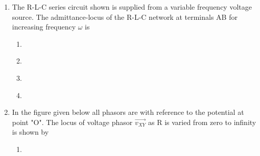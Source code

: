 \documentclass[journal]{IEEEtran}
\numberwithin{equation}{enumi}
\numberwithin{figure}{enumi}
\begin{document}
\begin{enumerate}
    \item 
    The R-L-C series circuit shown is supplied from a variable frequency voltage source. The admittance-locus of the R-L-C network at terminals AB for increasing frequency $\omega$ is

    \begin{figure}[H]
        \centering
        \resizebox{0.3\textwidth}{!}{}
    \end{figure}
    \hfill{}
        \begin{multicols}{2}
        \begin{enumerate}  
        
        \item 
        \begin{figure}[H]
        \centering
        \resizebox{0.3\textwidth}{!}{}
        \end{figure}
        \item 
        \begin{figure}[H]
        \centering
        \resizebox{0.3\textwidth}{!}{}
        \end{figure}
        
        \item 
        \begin{figure}[H]
        \centering
        \resizebox{0.26\textwidth}{!}{}
        \end{figure}
        

        \item 
        \begin{figure}[H]
        \centering
        \resizebox{0.26\textwidth}{!}{}
        \end{figure}
        
        \end{enumerate}
        \end{multicols}

    \item 
    In the figure given below all phasors are with reference to the potential at point "O". The locus of voltage phasor $\vec{v_{XY}}$ as R is varied from zero to infinity is shown by 

    \begin{figure}[H]
    \centering
    \resizebox{0.35\textwidth}{!}{}
    \end{figure}
    \hfill{}
    \begin{multicols}{2}
    \begin{enumerate}
        \item  
        \begin{figure}[H]
        \centering
        \resizebox{0.4\textwidth}{!}{}
        \end{figure}


\end{enumerate}
\end{multicols}
\end{enumerate}
\end{document}
